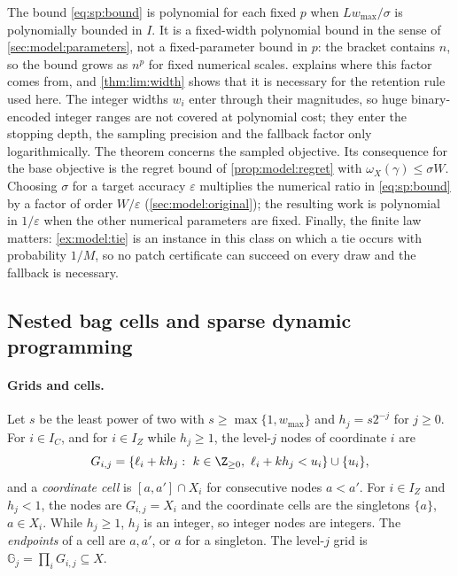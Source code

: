 The bound \eqref{eq:sp:bound} is polynomial for each fixed $p$ when
$Lw_{\max}/\sigma$ is polynomially bounded in $I$. It is a fixed-width
polynomial bound in the sense of \cref{sec:model:parameters}, not a
fixed-parameter bound in $p$: the bracket contains $n$, so the bound grows as
$n^p$ for fixed numerical scales.  explains where this
factor comes from, and \cref{thm:lim:width} shows that it is necessary for
the retention rule used here. The integer widths $w_i$ enter through their
magnitudes, so huge binary-encoded integer ranges are not covered at
polynomial cost; they enter the stopping depth, the sampling precision and
the fallback factor only logarithmically. The theorem concerns the sampled
objective. Its consequence for the base objective is the regret bound of
\cref{prop:model:regret} with $\omega_X(\gamma)\le\sigma W$. Choosing
$\sigma$ for a target accuracy $\varepsilon$ multiplies the numerical ratio
in \eqref{eq:sp:bound} by a factor of order $W/\varepsilon$
(\cref{sec:model:original}); the resulting work is polynomial in
$1/\varepsilon$ when the other numerical parameters are fixed. Finally, the
finite law matters: \cref{ex:model:tie} is an instance in this class on
which a tie occurs with probability $1/M$, so no patch certificate can
succeed on every draw and the fallback is necessary.

\subsection{Nested bag cells and sparse dynamic programming}\label{sec:sp:cells}

\paragraph{Grids and cells.}
Let $s$ be the least power of two with $s\ge\max\{1,w_{\max}\}$ and
$h_j=s2^{-j}$ for $j\ge0$. For $i\in I_C$, and for $i\in I_Z$ while
$h_j\ge1$, the level-$j$ nodes of coordinate $i$ are
\[
 G_{i,j}=\{\ell_i+kh_j:\ k\in\Z_{\ge0},\ \ell_i+kh_j<u_i\}\cup\{u_i\},
\]
and a \emph{coordinate cell} is $[a,a']\cap X_i$ for consecutive nodes
$a<a'$. For $i\in I_Z$ and $h_j<1$, the nodes are $G_{i,j}=X_i$ and the
coordinate cells are the singletons $\{a\}$, $a\in X_i$. While $h_j\ge1$,
$h_j$ is an integer, so integer nodes are integers. The \emph{endpoints} of
a cell are $a,a'$, or $a$ for a singleton. The level-$j$ grid is
$\mathbb G_j=\prod_iG_{i,j}\subseteq X$.

